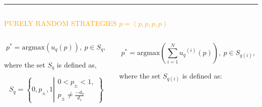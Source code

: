 \documentclass[usenames,dvipsnames,t]{beamer}
\begin{document}
\hrule height 3pt
\begin{columns}
    \begin{column}{.8\linewidth}
        \begin{center}
            \textcolor{orange}{\Large{PURELY RANDOM STRATEGIES \(p=(p, p, p, p)\)}}
            \vspace{1cm}

            \hspace{-2cm}
        \end{center}
\begin{columns}
    \begin{column}{.4\linewidth}
        \begin{minipage}{50cm}
        \begin{block}

            \[p^* = \text{argmax}(u_q(p)), \ p \in S_q,\]
            \vspace{0.3cm}

            \small{
            where the set \(S_q\) is defined as,}
        
            \[S_q = \left \{0, p_{\pm}, 1 \left | \begin{array}{l} 0 < p_{\pm} < 1,
            \\ p_{\pm} \neq \frac{-d_0}{d_1} \end{array} \right. \right\}\] \\

        \end{block}
    \end{minipage}
    \end{column}
    \begin{column}{.4\linewidth}
        \begin{minipage}{50cm}
            \begin{block}

            \[p^* = \text{argmax}(\displaystyle \sum_{i=1} ^ {N} {u_q}^{(i)} (p)), \ p \in S_{q(i)},\]
            \vspace{0.3cm}

            \small{
            where the set \(S_{q(i)}\) is defined as:}


\end{block}
\end{minipage}
\end{column}
\end{columns}
\end{column}
\end{columns}
\end{document}
